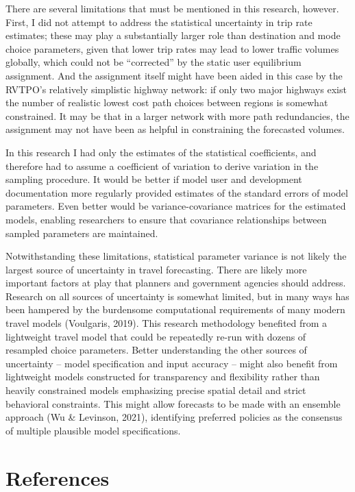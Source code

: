 \documentclass[fancy, masters, twoside]{byuthesis}
\begin{document}
There are several limitations that must be mentioned in this research, however. First, I did not attempt to address the statistical uncertainty in trip rate estimates; these may play a substantially larger role than destination and mode choice parameters, given that lower trip rates may lead to lower traffic volumes globally, which could not be ``corrected'' by the static user equilibrium assignment. And the assignment itself might have been aided in this case by the RVTPO's relatively simplistic highway network: if only two major highways exist the number of realistic lowest cost path choices between regions is somewhat constrained. It may be that in a larger network with more path redundancies, the assignment may not have been as helpful in constraining the forecasted volumes.

In this research I had only the estimates of the statistical coefficients, and therefore had to assume a coefficient of variation to derive variation in the sampling procedure. It would be better if model user and development documentation more regularly provided estimates of the standard errors of model parameters. Even better would be variance-covariance matrices for the estimated models, enabling researchers to ensure that covariance relationships between sampled parameters are maintained.

Notwithstanding these limitations, statistical parameter variance is not likely the largest source of uncertainty in travel forecasting. There are likely more important factors at play that planners and government agencies should address. Research on all sources of uncertainty is somewhat limited, but in many ways has been hampered by the burdensome computational requirements of many modern travel models (Voulgaris, 2019). This research methodology benefited from a lightweight travel model that could be repeatedly re-run with dozens of resampled choice parameters. Better understanding the other sources of uncertainty -- model specification and input accuracy -- might also benefit from lightweight models constructed for transparency and flexibility rather than heavily constrained models emphasizing precise spatial detail and strict behavioral constraints. This might allow forecasts to be made with an ensemble approach (Wu \& Levinson, 2021), identifying preferred policies as the consensus of multiple plausible model specifications.

\hypertarget{references}{%
\chapter*{References}\label{references}}
\end{document}
